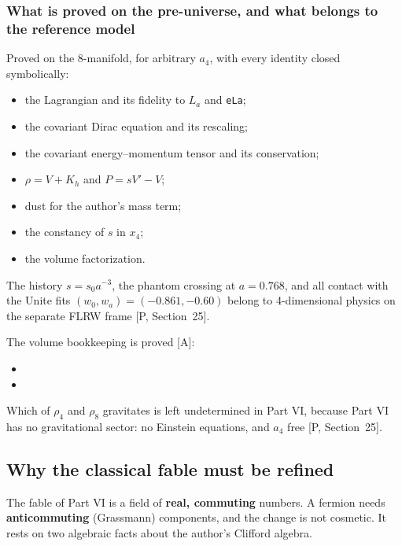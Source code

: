 \subsubsection{What is proved on the pre-universe, and what belongs to the reference model}
\label{sec:2.12.9}
Proved on the 8-manifold, for arbitrary $a_4$, with every identity closed symbolically:
\begin{itemize}
  \item the Lagrangian and its fidelity to $L_a$ and \texttt{eLa};
  \item the covariant Dirac equation and its rescaling;
  \item the covariant energy--momentum tensor and its conservation;
  \item $\rho=V+K_h$ and $P=sV'-V$;
  \item dust for the author's mass term;
  \item the constancy of $s$ in $x_4$;
  \item the volume factorization.
\end{itemize}
The history $s=s_0a^{-3}$, the phantom crossing at $a=0.768$, and all contact with the Unite
fits $(w_0,w_a)=(-0.861,-0.60)$ belong to 4-dimensional physics on the separate FLRW frame
[P, Section~25].

The volume bookkeeping is proved [A]:
\begin{itemize}
  \item {}
  \item {}
\end{itemize}
Which of $\rho_4$ and $\rho_8$ gravitates is left undetermined in Part VI, because Part VI has no
gravitational sector: no Einstein equations, and $a_4$ free [P, Section~25].

\subsection{Why the classical fable must be refined}
\label{fnd:refine}\label{sec:2.13}

The fable of Part VI is a field of \textbf{real, commuting} numbers. A fermion needs
\textbf{anticommuting} (Grassmann) components, and the change is not cosmetic. It rests on two
algebraic facts about the author's Clifford algebra.

